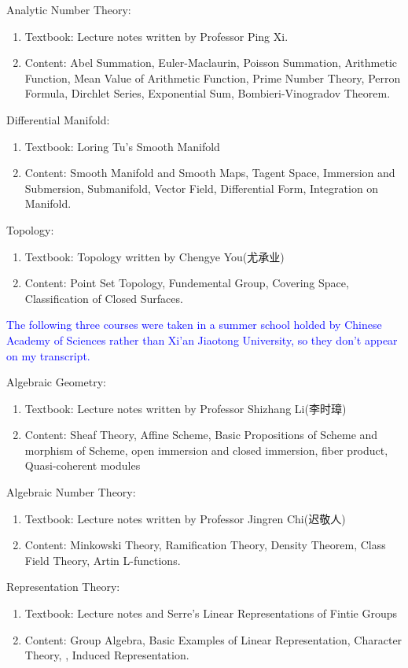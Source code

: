 \documentclass[12pt]{article}
\newcommand{\blue}[1]{\textcolor{blue}{#1}}
\newenvironment{enu}{\begin{enumerate}[(1)]}{\end{enumerate}}
\theoremstyle{definition}
\begin{document}
Analytic Number Theory: 
\begin{enu}
    \item Textbook: Lecture notes written by Professor Ping Xi. 
    \item Content: Abel Summation, Euler-Maclaurin, Poisson Summation, 
    Arithmetic Function, Mean Value of Arithmetic Function, Prime Number Theory, 
    Perron Formula, Dirchlet Series, Exponential Sum, Bombieri-Vinogradov Theorem. 
\end{enu}

Differential Manifold: 
\begin{enu}
    \item Textbook: Loring Tu's Smooth Manifold 
    \item Content: Smooth Manifold and Smooth Maps, Tagent Space, 
    Immersion and Submersion, Submanifold, Vector Field, Differential Form, Integration on Manifold. 
\end{enu}

Topology: 
\begin{enu}
    \item Textbook: Topology written by Chengye You(尤承业)
    \item Content: Point Set Topology, Fundemental Group, Covering Space, Classification of Closed Surfaces.
\end{enu}


\blue{The following three courses were taken in a summer school holded by Chinese
Academy of Sciences rather than Xi'an Jiaotong University, so they don't appear on my transcript.} 
\vskip 1cm 

Algebraic Geometry: 
\begin{enu}
    \item Textbook: Lecture notes written by Professor Shizhang Li(李时璋)
    \item Content: Sheaf Theory, Affine Scheme, 
    Basic Propositions of Scheme and morphism of Scheme, 
    open immersion and closed immersion, fiber product, Quasi-coherent modules
\end{enu}

Algebraic Number Theory: 
\begin{enu}
    \item Textbook: Lecture notes written by Professor Jingren Chi(迟敬人) 
    \item Content: Minkowski Theory, Ramification Theory, Density Theorem, 
    Class Field Theory, Artin L-functions.
\end{enu}

Representation Theory: 
\begin{enu}
    \item Textbook: Lecture notes and Serre's Linear Representations of Fintie Groups
    \item Content: Group Algebra, Basic Examples of Linear Representation, Character Theory, 
    , Induced Representation.
\end{enu}
\end{document}
